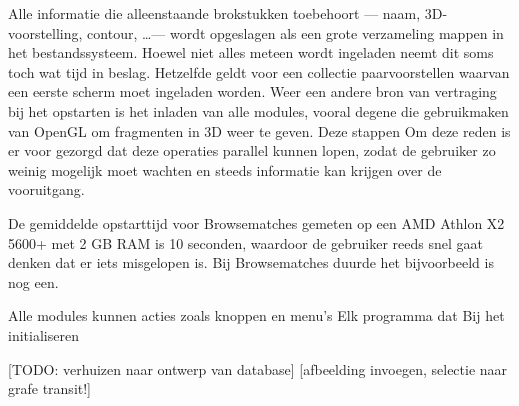 

Alle informatie die alleenstaande brokstukken toebehoort --- naam, 3D-voorstelling, contour, \ldots --- wordt opgeslagen als een grote verzameling mappen in het bestandssysteem. Hoewel niet alles meteen wordt ingeladen neemt dit soms toch wat tijd in beslag. Hetzelfde geldt voor een collectie paarvoorstellen waarvan een eerste scherm moet ingeladen worden. Weer een andere bron van vertraging bij het opstarten is het inladen van alle modules, vooral degene die gebruikmaken van OpenGL om fragmenten in 3D weer te geven. Deze stappen  Om deze reden is er voor gezorgd dat deze operaties parallel kunnen lopen, zodat de gebruiker zo weinig mogelijk moet wachten en steeds informatie kan krijgen over de vooruitgang.

De gemiddelde opstarttijd voor Browsematches gemeten op een AMD Athlon X2 5600+ met 2 GB RAM is 10 seconden, waardoor de gebruiker reeds snel gaat denken dat er iets misgelopen is. Bij Browsematches duurde het bijvoorbeeld  is nog  een. 

Alle modules kunnen acties zoals knoppen en menu's  Elk programma dat Bij het initialiseren 

[TODO: verhuizen naar ontwerp van database]
[afbeelding invoegen, selectie naar grafe transit!]\\